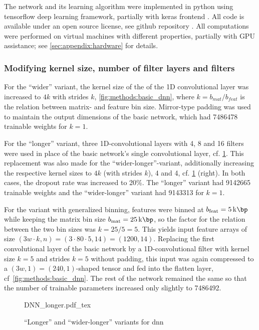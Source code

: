 The network and its learning algorithm were implemented in python using tensorflow deep learning framework, partially with keras frontend \cite{Abadi2015,Chollet2015}.
All code is available under an open source license, see github repository \cite{Krauth2021b}. 
All computations were performed on virtual machines with different properties, partially with GPU assistance; see \cref{sec:appendix:hardware} for details.

\subsubsection{Modifying kernel size, number of filter layers and filters} \label{sec:methods:variants}
For the ``wider'' variant, the kernel size of the of the 1D convolutional layer was increased to $4k$ with strides $k$, \cref{fig:methods:basic_dnn},
where $k=b_\mathit{mat}/b_\mathit{feat}$ is the relation between matrix- and feature bin size.
Mirror-type padding was used to maintain the output dimensions of the basic network, which had \SI{7486478}{} trainable weights
for $k=1$.

For the ``longer'' variant, three 1D-convolutional layers with 4, 8 and 16 filters 
were used in place of the basic network's single convolutional layer, cf. \cref{fig:methods:longer_dnn}.
This replacement was also made for the ``wider-longer''-variant, 
additionally increasing the respective kernel sizes to $4k$ (with strides $k$), 4 and 4, cf. \cref{fig:methods:longer_dnn} (right).
In both cases, the dropout rate was increased to 20\%.
The ``longer'' variant had \SI{9142665}{} trainable weights and the ``wider-longer'' variant had \SI{9143313}{} for $k=1$.

For the variant with generalized binning, features were binned at $b_\textrm{feat} = \SI{5}{\kilo\bp}$ while keeping the matrix bin size $b_\textrm{mat} = \SI{25}{\kilo\bp}$,
so the factor for the relation between the two bin sizes was $k=25/5=5$.
This yields input feature arrays of size $(3w\cdot k, n) = (3\cdot80\cdot5 , 14) = (1200, 14)$.
Replacing the first convolutional layer of the basic network by a 1D-convolutional filter with kernel size $k=5$ and strides $k=5$ without padding,
this input was again compressed to a $(3w, 1) = (240, 1)$-shaped tensor and fed into the flatten layer, cf~\cref{fig:methods:basic_dnn}. 
The rest of the network remained the same so that the number of trainable parameters increased only slightly to \SI{7486492}{}.
\begin{figure}[p]
    \small
    \centering
    {DNN_longer.pdf_tex}
    \caption{``Longer'' and ``wider-longer'' variants for \acrshort{dnn}}
    \label{fig:methods:longer_dnn}
\end{figure}

